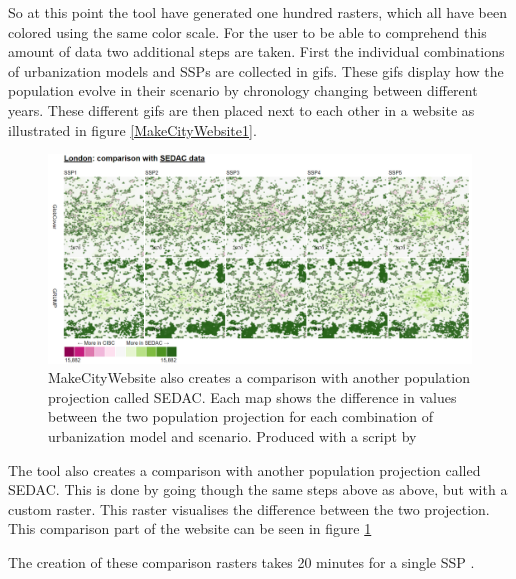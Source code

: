 So at this point the tool have generated one hundred rasters, which all have been colored using the same color scale. For the user to be able to comprehend this amount of data two additional steps are taken. First the individual combinations of urbanization models and SSPs are collected in gifs. These gifs display how the population evolve in their scenario by chronology changing between different years. These different gifs are then placed next to each other in a website as illustrated in figure \ref{MakeCityWebsite1}. 

\begin{figure} [H]
	\centering
	\includegraphics[width=.8\textwidth]{Pictures/MakeCityWebsite2}
	\caption{MakeCityWebsite also creates a comparison with another population projection called SEDAC. Each map shows the difference in values between the two population projection for each combination of urbanization model and scenario. Produced with a script by \citet{MakeCityWebsite}}
	\label{MakeCityWebsite2}
\end{figure}

The tool also creates a comparison with another population projection called SEDAC. This is done by going though the same steps above as above, but with a custom raster. This raster visualises the difference between the two projection. This comparison part of the website can be seen in figure \ref{MakeCityWebsite2}

The creation of these comparison rasters takes 20 minutes for a single SSP \citep{min20}.





